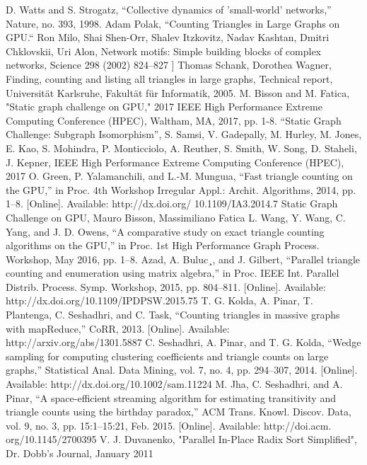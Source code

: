 \documentclass[conference]{IEEEtran}
\begin{document}
\begin{thebibliography}{00}
 D. Watts and S. Strogatz, “Collective dynamics of ’small-world’ networks,” Nature, no. 393, 1998.
 Adam Polak, “Counting Triangles in Large Graphs on GPU.“
 Ron Milo, Shai Shen-Orr, Shalev Itzkovitz, Nadav Kashtan, Dmitri Chklovskii, Uri Alon, Network motifs: Simple building blocks of complex networks, Science 298 (2002) 824–827
 ] Thomas Schank, Dorothea Wagner, Finding, counting and listing all triangles in large graphs, Technical report, Universität Karlsruhe, Fakultät für Informatik, 2005.
 M. Bisson and M. Fatica, "Static graph challenge on GPU," 2017 IEEE High Performance Extreme Computing Conference (HPEC), Waltham, MA, 2017, pp. 1-8.
 “Static Graph Challenge: Subgraph Isomorphism”, S. Samsi, V. Gadepally, M. Hurley, M. Jones, E. Kao, S. Mohindra, P. Monticciolo, A. Reuther, S. Smith, W. Song, D. Staheli, J. Kepner, IEEE High Performance Extreme Computing Conference (HPEC), 2017
  O. Green, P. Yalamanchili, and L.-M. Munguıa, “Fast triangle counting on the GPU,” in Proc. 4th Workshop Irregular Appl.: Archit. Algorithms, 2014, pp. 1–8. [Online]. Available: http://dx.doi.org/ 10.1109/IA3.2014.7
 Static Graph Challenge on GPU, Mauro Bisson, Massimiliano Fatica
 L. Wang, Y. Wang, C. Yang, and J. D. Owens, “A comparative study on exact triangle counting algorithms on the GPU,” in Proc. 1st High Performance Graph Process. Workshop, May 2016, pp. 1–8.
 Azad, A. Buluc¸, and J. Gilbert, “Parallel triangle counting and enumeration using matrix algebra,” in Proc. IEEE Int. Parallel Distrib. Process. Symp. Workshop, 2015, pp. 804–811. [Online]. Available: http://dx.doi.org/10.1109/IPDPSW.2015.75
 T. G. Kolda, A. Pinar, T. Plantenga, C. Seshadhri, and C. Task, “Counting triangles in massive graphs with mapReduce,” CoRR, 2013. [Online]. Available: http://arxiv.org/abs/1301.5887
  C. Seshadhri, A. Pinar, and T. G. Kolda, “Wedge sampling for computing clustering coefficients and triangle counts on large graphs,” Statistical Anal. Data Mining, vol. 7, no. 4, pp. 294–307, 2014. [Online]. Available: http://dx.doi.org/10.1002/sam.11224
 M. Jha, C. Seshadhri, and A. Pinar, “A space-efficient streaming algorithm for estimating transitivity and triangle counts using the birthday paradox,” ACM Trans. Knowl. Discov. Data, vol. 9, no. 3, pp. 15:1–15:21, Feb. 2015. [Online]. Available: http://doi.acm. org/10.1145/2700395
 V. J. Duvanenko, "Parallel In-Place Radix Sort Simplified", Dr. Dobb's Journal, January 2011

\end{thebibliography}
\end{document}
